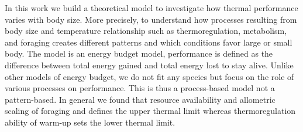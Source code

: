 
 In this work we build a theoretical model to investigate how thermal performance varies with body size.
 More precisely, to understand how processes resulting from body size and temperature relationship such as thermoregulation, metabolism, and foraging creates different patterns and which conditions favor large or small body.
 The model is an energy budget model, performance is defined as the difference between total energy gained and total energy lost to stay alive.
 Unlike other models of energy budget, we do not fit any species but focus on the role of various processes on performance. This is thus a process-based model not a pattern-based.
In general we found that resource availability and allometric scaling of foraging and defines the upper thermal limit whereas thermoregulation ability of warm-up sets the lower thermal limit.

